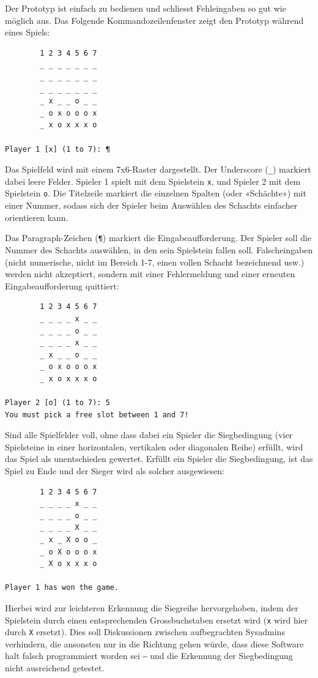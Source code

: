 \documentclass[a4paper,11pt,hidelinks]{scrartcl}
\begin{document}
Der Prototyp ist einfach zu bedienen und schliesst Fehleingaben so gut wie möglich aus. Das Folgende Kommandozeilenfenster zeigt den Prototyp während eines Spiels:

\begin{lstlisting}
        1 2 3 4 5 6 7
        _ _ _ _ _ _ _
        _ _ _ _ _ _ _
        _ _ _ _ _ _ _
        _ x _ _ o _ _
        _ o x o o o x
        _ x o x x x o

Player 1 [x] (1 to 7): ¶
\end{lstlisting}

Das Spielfeld wird mit einem 7x6-Raster dargestellt. Der Underscore (\texttt{\_}) markiert dabei leere Felder. Spieler 1 spielt mit dem Spielstein \texttt{x}, und Spieler 2 mit dem Spielstein \texttt{o}. Die Titelzeile markiert die einzelnen Spalten (oder «Schächte») mit einer Nummer, sodass sich der Spieler beim Auswählen des Schachts einfacher orientieren kann.

Das Paragraph-Zeichen (\texttt{¶}) markiert die Eingabeaufforderung. Der Spieler soll die Nummer des Schachts auswählen, in den sein Spielstein fallen soll. Falscheingaben (nicht numerische, nicht im Bereich 1-7, einen vollen Schacht bezeichnend usw.) werden nicht akzeptiert, sondern mit einer Fehlermeldung und einer erneuten Eingabeaufforderung quittiert:

\begin{lstlisting}
        1 2 3 4 5 6 7
        _ _ _ _ x _ _
        _ _ _ _ o _ _
        _ _ _ _ x _ _
        _ x _ _ o _ _
        _ o x o o o x
        _ x o x x x o

Player 2 [o] (1 to 7): 5
You must pick a free slot between 1 and 7!
\end{lstlisting}

Sind alle Spielfelder voll, ohne dass dabei ein Spieler die Siegbedingung (vier Spielsteine in einer horizontalen, vertikalen oder diagonalen Reihe) erfüllt, wird das Spiel als unentschieden gewertet. Erfüllt ein Spieler die Siegbedingung, ist das Spiel zu Ende und der Sieger wird als solcher ausgewiesen:

\begin{lstlisting}
        1 2 3 4 5 6 7
        _ _ _ _ x _ _
        _ _ _ _ o _ _
        _ _ _ _ X _ _
        _ x _ X o o _
        _ o X o o o x
        _ X o x x x o

Player 1 has won the game.
\end{lstlisting}

Hierbei wird zur leichteren Erkennung die Siegreihe hervorgehoben, indem der Spielstein durch einen entsprechenden Grossbuchstaben ersetzt wird (\texttt{x} wird hier durch \texttt{X} ersetzt). Dies soll Diskussionen zwischen aufbegrachten Sysadmins verhindern, die ansonsten nur in die Richtung gehen würde, dass diese Software halt falsch programmiert worden sei ‒ und die Erkennung der Siegbedingung nicht ausreichend getestet.
\end{document}
